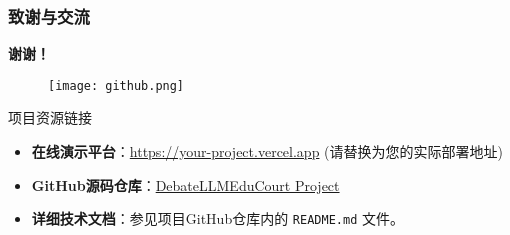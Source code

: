 \documentclass[aspectratio=169]{beamer} %
\newcommand{\hrefcol}[2]{\textcolor{cyan}{\href{#1}{#2}}}
\begin{document}
\begin{frame}[shrink=5]
\frametitle{致谢与交流}
\begin{center}
\Large \textbf{谢谢！}
\end{center}
\begin{figure}
    \centering
    \texttt{[image: github.png]} %
\end{figure}

\begin{block}{项目资源链接}
\begin{itemize}
\item \textbf{在线演示平台}：\hrefcol{https://your-project.vercel.app}{https://your-project.vercel.app} (请替换为您的实际部署地址)
\item \textbf{GitHub源码仓库}：\hrefcol{https://github.com/Summerlemon233/DebateLLMEduCourt}{DebateLLMEduCourt Project}
\item \textbf{详细技术文档}：参见项目GitHub仓库内的 \texttt{README.md} 文件。
\end{itemize}
\end{block}
\vspace{0.5cm}
\end{frame}
\end{document}
